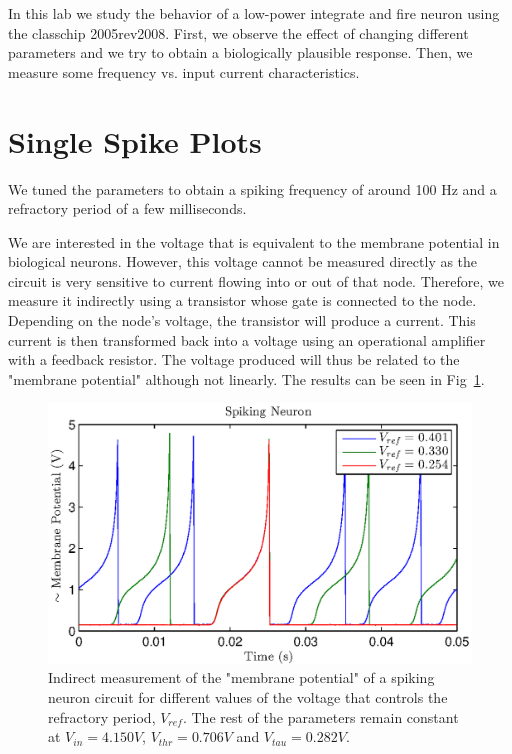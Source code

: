 

\newcommand{\reffig}[1]{Fig.~\ref{#1}}



\newpage

In this lab we study the behavior of a low-power integrate and fire neuron using the classchip 2005rev2008. First, we observe the effect of changing different parameters and we try to obtain a biologically plausible response. Then, we measure some frequency vs. input current characteristics. \\

\section{Single Spike Plots}

We tuned the parameters to obtain a spiking frequency of around 100 Hz and a refractory period of a few milliseconds. 

We are interested in the voltage that is equivalent to the membrane potential in biological neurons. However, this voltage cannot be measured directly as the circuit is very sensitive to current flowing into or out of that node. Therefore, we measure it indirectly using a transistor whose gate is connected to the node. Depending on the node's voltage, the transistor will produce a current. This current is then transformed back into a voltage using an operational amplifier with a feedback resistor. The voltage produced will thus be related to the "membrane potential" although not linearly. The results can be seen in Fig~\ref{fig:exp1a}. 
\begin{figure}[!h]
    \center
    \includegraphics{exp1a.eps}
    \caption{Indirect measurement of the "membrane potential" of a spiking neuron circuit for different values of the voltage that controls the refractory period, $V_{ref}$. The rest of the parameters remain constant at $V_{in}=4.150 V$, $V_{thr}=0.706 V$ and $V_{tau}=0.282 V$. }
    \label{fig:exp1a}
\end{figure}

